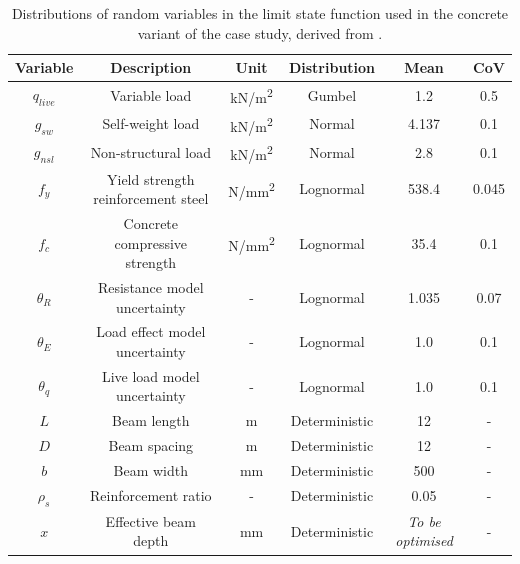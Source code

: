 \begin{table}[h]
    \centering
    
    \begin{tabular}{c|c|c|c|c|c}
         Variable & Description & Unit & Distribution & Mean & CoV  \\ \hline
         $q_{live}$& Variable load & kN/m\textsuperscript{2}& Gumbel & 1.2&0.5\\
         $g_{sw}$& Self-weight load& kN/m\textsuperscript{2}& Normal& 4.137& 0.1\\
         $g_{nsl}$& Non-structural load& kN/m\textsuperscript{2}& Normal& 2.8&0.1\\
         $f_y$& Yield strength reinforcement steel& N/mm\textsuperscript{2}& Lognormal& 538.4&0.045\\
 $f_c$& Concrete compressive strength& N/mm\textsuperscript{2}& Lognormal& 35.4&0.1\\
         $\theta_R$& Resistance model uncertainty&-& Lognormal& 1.035&0.07\\
         $\theta_E$& Load effect model uncertainty&-& Lognormal& 1.0&0.1\\
         $\theta_q$& Live load model uncertainty&-& Lognormal& 1.0&0.1\\
         $L$ & Beam length & m & Deterministic & 12 & - \\
         $D$ & Beam spacing & m & Deterministic & 12 & - \\
 $b$& Beam width& mm& Deterministic & 500&-\\
 $\rho_s$& Reinforcement ratio& -& Deterministic & 0.05&-\\
         $x$& Effective beam depth& mm& Deterministic & \emph{To be optimised} & - \\
    \end{tabular}
 \caption{Distributions of random variables in the limit state function used in the concrete variant of the case study, derived from \citep{Vrouwenvelder2024ReliabilityEurocodes,Hingorani2023TowardsDesign}.}   \label{tab:distributions_concrete}
\end{table}

